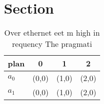 \documentclass[a4paper]{article}
\begin{document}
\section{Section}

\begin{table}
\begin{adjustbox}{width=0.6\columnwidth}
\begin{tabular}{|l|l|l|l|}
\hline
\textbf{plan} & \multicolumn{1}{c|}{\textbf{0}} & \multicolumn{1}{c|}{\textbf{1}} & \multicolumn{1}{c|}{\textbf{2}} \\ \hline
\textbf{$a_0$}  & (0,0) & (1,0) & (2,0) \\ \hline
\textbf{$a_1$}  & (0,0) & (1,0) & (2,0) \\ \hline
\end{tabular}
\end{adjustbox}
\caption{Over ethernet eet m high in requency The pragmati
}
\end{table}
\end{document}
